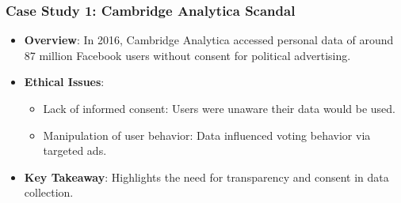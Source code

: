 \documentclass{beamer}
\begin{document}
\begin{frame}[fragile]
    \frametitle{Case Study 1: Cambridge Analytica Scandal}
    \begin{itemize}
        \item \textbf{Overview}: In 2016, Cambridge Analytica accessed personal data of around 87 million Facebook users without consent for political advertising.
        \item \textbf{Ethical Issues}:
            \begin{itemize}
                \item Lack of informed consent: Users were unaware their data would be used.
                \item Manipulation of user behavior: Data influenced voting behavior via targeted ads.
            \end{itemize}
        \item \textbf{Key Takeaway}: Highlights the need for transparency and consent in data collection.
    \end{itemize}
\end{frame}
\end{document}
